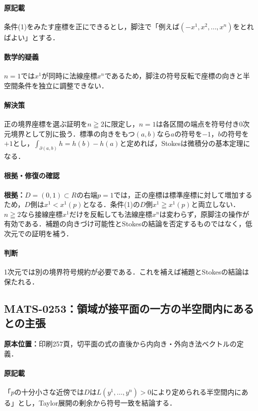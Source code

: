 \documentclass[a4paper,10pt]{ltjsarticle}
\begin{document}
\paragraph{原記載}条件(1)をみたす座標を正にできるとし，脚注で「例えば$(-x^1,x^2,\ldots,x^n)$をとればよい」とする．

\paragraph{数学的疑義}$n=1$では$x^1$が同時に法線座標$x^n$であるため，脚注の符号反転で座標の向きと半空間条件を独立に調整できない．

\paragraph{解決策}正の境界座標を選ぶ証明を$n\geqq2$に限定し，$n=1$は各区間の端点を符号付き0次元境界として別に扱う．標準の向きをもつ$(a,b)$なら$a$の符号を$-1$，$b$の符号を$+1$とし，$\int_{\partial(a,b)}h=h(b)-h(a)$と定めれば，Stokesは微積分の基本定理になる．

\paragraph{根拠・修復の確認}\textbf{根拠：}$D=(0,1)\subset R$の右端$p=1$では，正の座標は標準座標に対して増加するため，$D$側は$x^1<x^1(p)$となる．条件(1)の$D$側$x^1\geqq x^1(p)$と両立しない．$n\geqq2$なら接線座標$x^1$だけを反転しても法線座標$x^n$は変わらず，原脚注の操作が有効である．補題の向きづけ可能性とStokesの結論を否定するものではなく，低次元での証明を補う．

\paragraph{判断}1次元では別の境界符号規約が必要である．これを補えば補題とStokesの結論は保たれる．


\subsection*{MATS-0253：領域が接平面の一方の半空間内にあるとの主張}\label{math:MATS-0253}
\noindent\textbf{原本位置：}印刷257頁，切平面の式の直後から内向き・外向き法ベクトルの定義．

\paragraph{原記載}「$p$の十分小さな近傍では$D$は$L(y^1,\ldots,y^n)>0$により定められる半空間内にある」とし，Taylor展開の剰余から符号一致を結論する．
\end{document}
